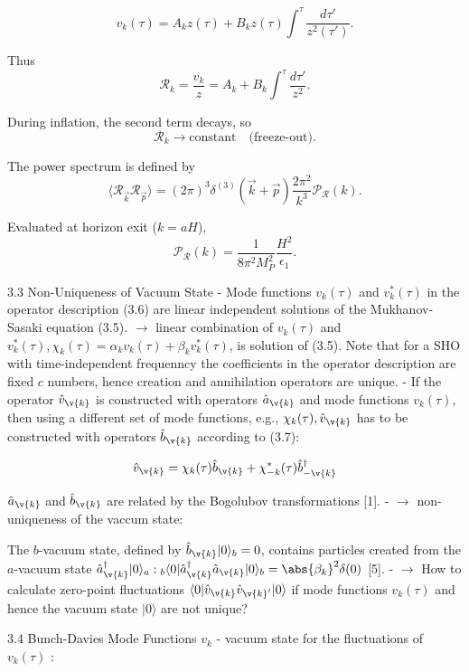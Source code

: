 $$
v_k(\tau)=A_k z(\tau)+B_k z(\tau)\int^\tau \frac{d\tau'}{z^2(\tau')}.  
$$

Thus  
$$
\mathcal R_k=\frac{v_k}{z}=A_k + B_k\int^\tau \frac{d\tau'}{z^2}.  
$$

During inflation, the second term decays, so  
$$
\boxed{\mathcal R_k \to \text{constant}}  
\quad\text{(freeze-out).}  
$$

The power spectrum is defined by  
$$
\langle \mathcal R_{\vec k}\mathcal R_{\vec p}\rangle  
=(2\pi)^3\delta^{(3)}(\vec k+\vec p)\frac{2\pi^2}{k^3}\mathcal P_\mathcal R(k).  
$$

Evaluated at horizon exit ($k=aH$),  
$$
\boxed{  
\mathcal P_\mathcal R(k)=  
\frac{1}{8\pi^2M_P^2}\frac{H^2}{\epsilon_1}.  
}  
$$





3.3 Non-Uniqueness of Vacuum State
- Mode functions $v_k(\tau)$ and $v_k^*(\tau)$ in the operator description (3.6) are linear independent solutions of the Mukhanov-Sasaki equation (3.5).
$\rightarrow$ linear combination of $v_k(\tau)$ and $v_k^*(\tau), \chi_k(\tau)=\alpha_k v_k(\tau)+\beta_k v_k^*(\tau)$, is solution of (3.5).
Note that for a SHO with time-independent frequenncy the coefficients in the operator description are fixed $c$ numbers, hence creation and annihilation operators are unique.
- If the operator $\hat{v}_{\v{k}}$ is constructed with operators $\hat{a}_{\v{k}}$ and mode functions $v_k(\tau)$, then using a different set of mode functions, e.g., $\chi_k(\tau), \hat{v}_{\v{k}}$ has to be constructed with operators $\hat{b}_{\v{k}}$ according to (3.7):

\[
\hat{v}_{\v{k}}=\chi_k(\tau) \hat{b}_{\v{k}}+\chi_{-k}^*(\tau) \hat{b}_{-\v{k}}^{\dagger}
\]

$\hat{a}_{\v{k}}$ and $\hat{b}_{\v{k}}$ are related by the Bogolubov transformations [1].
- $\rightarrow$ non-uniqueness of the vaccum state:

The $b$-vacuum state, defined by $\hat{b}_{\v{k}}|0\rangle_b=0$, contains particles created from the $a$-vacuum state $\hat{a}_{\v{k}}^{\dagger}|0\rangle_a:{ }_b\langle 0| \hat{a}_{\v{k}}^{\dagger} \hat{a}_{\v{k}}|0\rangle_b=\abs{\beta_k}^2 \delta(0)$ [5].
- $\rightarrow$ How to calculate zero-point fluctuations $\langle 0| \hat{v}_{\v{k}} \hat{v}_{\v{k}^{\prime}}|0\rangle$ if mode functions $v_k(\tau)$ and hence the vacuum state $|0\rangle$ are not unique?

3.4 Bunch-Davies Mode Functions $v_k$
- vacuum state for the fluctuations of $v_k(\tau)$ :


